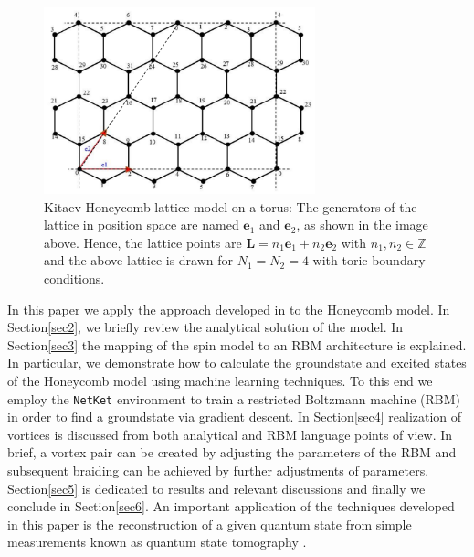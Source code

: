 \documentclass{article}
\begin{document}
\begin{figure}[h!]
	\centering
	\includegraphics[width=0.7\textwidth]{./images/diag_1.png}
	\caption{\label{kit_torus} Kitaev Honeycomb lattice model on a torus: The generators of the lattice in position space are named
	$\textbf{e}_{1}$ and  $\textbf{e}_{2}$, as shown in the image above. Hence, the lattice points are $\textbf{L} = n_{1}\textbf{e}_{1} + 
	n_{2}\textbf{e}_{2}$ with $n_{1}, n_{2} \in \mathbb{Z}$ and the above lattice is drawn for $N_{1} = N_{2} = 4 $ with toric boundary conditions.} 
	\label{fig:fig1}
\end{figure}

In this paper we apply the approach developed in \cite{Deng_2017} to the Honeycomb model. In Section\hspace{0.2mm}\ref{sec2}, we briefly review the analytical solution of the model. In Section\hspace{0.2mm}\ref{sec3} the mapping of the spin model to an RBM architecture is explained. In particular, we demonstrate how to calculate the groundstate and excited states of the Honeycomb model using machine learning techniques. To this end we employ the \texttt{NetKet} environment \cite{netket:2019} to train a restricted Boltzmann machine (RBM) in order to find a groundstate via gradient descent. In Section\hspace{0.2mm}\ref{sec4} realization of vortices is discussed from both analytical and RBM language points of view. In brief, a vortex pair can be created by adjusting the parameters of the RBM and subsequent braiding can be achieved by further adjustments of parameters. Section\hspace{0.2mm}\ref{sec5} is dedicated to results and relevant discussions and finally we conclude in Section\hspace{0.2mm}\ref{sec6}. An important application of the techniques developed in this paper is the reconstruction of a given quantum state from simple measurements known as quantum state tomography \cite{Torlai_2018}.
\end{document}

